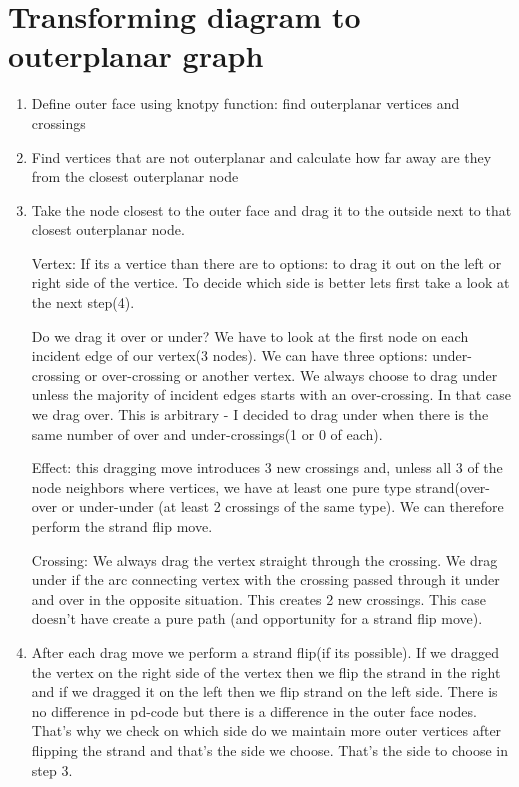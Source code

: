 \documentclass{article}
\begin{document}
\section{Transforming diagram to outerplanar graph}
\begin{enumerate}
\item Define outer face using knotpy function: find outerplanar vertices and crossings
\item Find vertices that are not outerplanar and calculate how far away are they from the closest outerplanar node
\item Take the node closest to the outer face and drag it to the outside next to that closest outerplanar node. 

Vertex:
If its a vertice than there are to options: to drag it out on the left or right side of the vertice. To decide which side is better lets first take a look at the next step(4).

Do we drag it over or under?
We have to look at the first node on each incident edge of our vertex(3 nodes). We can have three options: under-crossing or over-crossing or another vertex. We always choose to drag under unless the majority of incident edges starts with an over-crossing. In that case we drag over. This is arbitrary - I decided to drag under when there is the same number of over and under-crossings(1 or 0 of each).

Effect: this dragging move introduces 3 new crossings and, unless all 3 of the node neighbors where vertices, we have at least one pure type strand(over-over or under-under (at least 2 crossings of the same type). We can therefore perform the strand flip move.

Crossing:
We always drag the vertex straight through the crossing. We drag under if the arc connecting vertex with the crossing passed through it under and over in the opposite situation.
This creates 2 new crossings. This case doesn't have create a pure path (and opportunity for a strand flip move).
\item After each drag move we perform a strand flip(if its possible). If we dragged the vertex on the right side of the vertex then we flip the strand in the right and if we dragged it on the left then we flip strand on the left side. There is no difference in pd-code but there is a difference in the outer face nodes. That's why we check on which side do we maintain more outer vertices after flipping the strand and that's the side we choose. That's the side to choose in step 3.


\end{enumerate}
\end{document}
